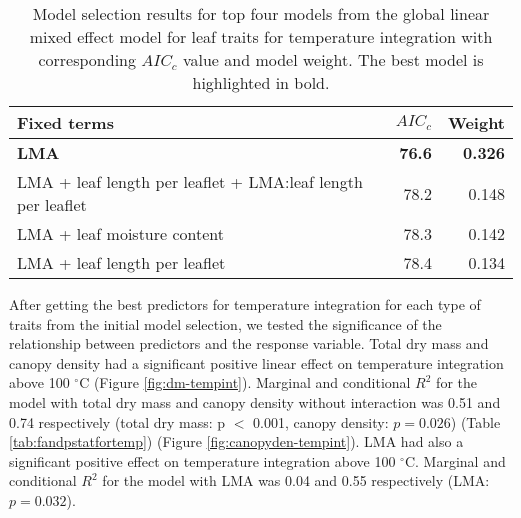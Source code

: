 \documentclass{ttuthes2007}
\begin{document}


\begin{table}
  \centering
  \caption{Model selection results for top four models from the global linear
    mixed effect model for leaf traits for temperature integration with
    corresponding $AIC_{c}$ value and model weight. The best model is highlighted in bold.}
  \begin{tabular}{lrr}
    \toprule
    \textbf{Fixed terms} & $AIC_{c}$ & \textbf{Weight}\\
    \midrule
    \textbf{LMA} & \textbf{76.6} & \textbf{0.326} \\
    LMA + leaf length per leaflet + LMA:leaf length per leaflet & 78.2     & 0.148    \\
    LMA + leaf moisture content                                 & 78.3     & 0.142    \\
    LMA + leaf length per leaflet                               & 78.4     & 0.134    \\
    \bottomrule
  \end{tabular}
  \label{tab:leaf_models}
\end{table}




\noindent After getting the best predictors for temperature integration for each type of traits from the initial model selection,
we tested the significance of the relationship  between predictors and the response variable. Total dry mass and canopy density had a significant positive linear effect %
on temperature integration above 100 $^{\circ}$C (Figure \ref{fig:dm-tempint}). Marginal and conditional $R^2$ for the model with total dry mass and canopy density without interaction was 0.51 and 0.74 respectively (total dry mass: p $<$ 0.001, canopy density: $p = 0.026$) (Table \ref{tab:fandpstatfortemp}) (Figure \ref{fig:canopyden-tempint}). LMA had also a significant positive effect on temperature integration above 100 $^{\circ}$C. Marginal  and conditional $R^2$ for the model with LMA was 0.04 and 0.55 respectively (LMA: $p = 0.032$). 
\end{document}
